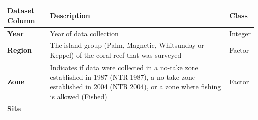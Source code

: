 \documentclass[12pt,]{article}
\begin{document}
~ ~ ~

\begin{longtable}[]{@{}lll@{}}
\toprule
\begin{minipage}[b]{0.44\columnwidth}\raggedright
Dataset Column\strut
\end{minipage} & \begin{minipage}[b]{0.32\columnwidth}\raggedright
Description\strut
\end{minipage} & \begin{minipage}[b]{0.15\columnwidth}\raggedright
Class\strut
\end{minipage}\tabularnewline
\midrule
\endhead
\begin{minipage}[t]{0.44\columnwidth}\raggedright
\textbf{Year}\strut
\end{minipage} & \begin{minipage}[t]{0.32\columnwidth}\raggedright
Year of data collection\strut
\end{minipage} & \begin{minipage}[t]{0.15\columnwidth}\raggedright
Integer\strut
\end{minipage}\tabularnewline
\begin{minipage}[t]{0.44\columnwidth}\raggedright
\textbf{Region}\strut
\end{minipage} & \begin{minipage}[t]{0.32\columnwidth}\raggedright
The island group (Palm, Magnetic, Whitsunday or Keppel) of the coral
reef that was surveyed\strut
\end{minipage} & \begin{minipage}[t]{0.15\columnwidth}\raggedright
Factor\strut
\end{minipage}\tabularnewline
\begin{minipage}[t]{0.44\columnwidth}\raggedright
\textbf{Zone}\strut
\end{minipage} & \begin{minipage}[t]{0.32\columnwidth}\raggedright
Indicates if data were collected in a no-take zone established in 1987
(NTR 1987), a no-take zone established in 2004 (NTR 2004), or a zone
where fishing is allowed (Fished)\strut
\end{minipage} & \begin{minipage}[t]{0.15\columnwidth}\raggedright
Factor\strut
\end{minipage}\tabularnewline
\begin{minipage}[t]{0.44\columnwidth}\raggedright
\textbf{Site}\strut
\end{minipage} & \begin{minipage}[t]{0.32\columnwidth}\raggedright

\end{minipage}
\end{longtable}
\end{document}
